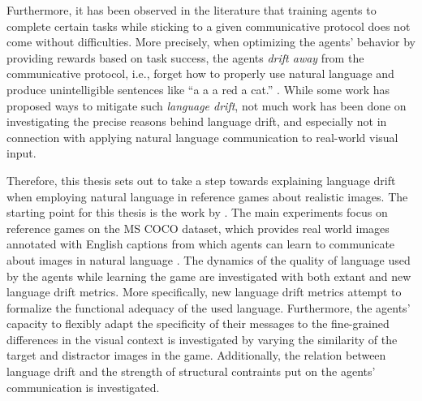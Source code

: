 Furthermore, it has been observed in the literature that training agents to complete certain tasks while sticking to a given communicative protocol does not come without difficulties. More precisely, when optimizing the agents' behavior by providing rewards based on task success, the agents \textit{drift away} from the communicative protocol, i.e., forget how to properly use natural language and produce unintelligible sentences like ``a a a red a cat.'' \parencite{lee2019countering, lazaridou2020multi, lu2020countering, lewis2017deal}. While some work has proposed ways to mitigate such \textit{language drift}, not much work has been done on investigating the precise reasons behind language drift, and especially not in connection with applying natural language communication to real-world visual input. 

Therefore, this thesis sets out to take a step towards explaining language drift when employing natural language in reference games about realistic images. The starting point for this thesis is the work by \cite{lazaridou2020multi}. The main  experiments focus on reference games on the MS COCO dataset, which provides real world images annotated with English captions from which agents can learn to communicate about images in natural language \parencite{chen2015microsoft}. The dynamics of the quality of language used by the agents while learning the game are investigated with both extant and new language drift metrics. More specifically, new language drift metrics attempt to formalize the functional adequacy of the used language. Furthermore, the agents' capacity to flexibly adapt the specificity of their messages to the fine-grained differences in the visual context is investigated by varying the similarity of the target and distractor images in the game. Additionally, the relation between language drift and the strength of structural contraints put on the agents' communication is investigated.

